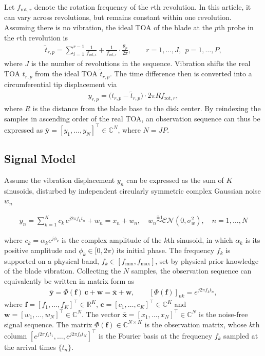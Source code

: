 \documentclass[journal,onecolumn]{IEEEtran}
\begin{document}
Let $f_{\mathrm{rot},r}$ denote the rotation frequency of the $r$th revolution. In this article, it can vary across revolutions, but remains constant within one revolution. Assuming there is no vibration, the ideal TOA of the blade at the $p$th probe in the $r$th revolution is 
\begin{eqnarray}
\label{eq:toa}
\tilde{t}_{r,p}=\sum_{i=1}^{r-1}\frac{1}{f_{\mathrm{rot},i}}+\frac{1}{f_{\mathrm{rot},r}}\cdot\frac{\theta_p}{2\pi},
\qquad r=1,\dots,J,\ \ p=1,\dots,P,
\end{eqnarray}
where $J$ is the number of revolutions in the sequence. Vibration shifts the real TOA $t_{r,p}$ from the ideal TOA $\tilde{t}_{r,p}$.  The time difference then is converted into a circumferential tip displacement via
\begin{eqnarray}
\label{eq:disp}
y_{r,p}=\big(t_{r,p}-\tilde{t}_{r,p}\big)\cdot 2\pi Rf_{\mathrm{rot},r},
\end{eqnarray}
where $R$ is the distance from the blade base to the disk center. By reindexing the samples in ascending order of the real TOA, an observation sequence can thus be expressed as $\bar{\mathbf{y}}=[y_1,\dots,y_N]^{\top}\in\mathbb{C}^{N}$, where $N=JP$.

\subsection{Signal Model}
Assume the vibration displacement $y_{n}$ can be expressed as the sum of $K$ sinusoids, disturbed by independent circularly symmetric complex Gaussian noise $w_n$

\begin{eqnarray}
\label{eq:signal}
    y_n = \sum_{k=1}^K c_k \, e^{j 2\pi f_k t_{n}} + w_{n} = x_{n} + w_{n}, \quad w_n \overset{\mathrm{iid}}{\sim} \mathcal{CN}(0,\sigma_w^2), \quad n = 1,\dots,N
\end{eqnarray}

where $c_k = \alpha_k e^{j \phi_k}$ is the complex amplitude of the $k$th sinusoid, in which $\alpha_k$ is its positive amplitude and $\phi_k\in[0,2\pi)$ its initial phase. The frequency $f_k$ is supported on a physical band, $f_k\in[f_{\min},f_{\max}]$, set by physical prior knowledge of the blade vibration.
Collecting the $N$ samples, the observation sequence can equivalently be written in matrix form as
\begin{eqnarray}
\label{eq:matrixform}
\bar{\mathbf{y}} = \Phi(\mathbf{f})\,\mathbf{c} + \mathbf{w} = \bar{\mathbf{x}} + \mathbf{w},
\qquad [\Phi(\mathbf{f})]_{nk} = e^{j 2\pi f_k t_{n}},
\end{eqnarray}
where $\mathbf{f}=[f_1,\dots,f_K]^{\top}\in\mathbb{R}^{K}$, $\mathbf{c}=[c_1,\dots,c_K]^{\top}\in\mathbb{C}^{K}$ and $\mathbf{w}=[w_1,\dots,w_N]^{\top}\in\mathbb{C}^{N}$. The vector $\bar{\mathbf{x}}=[x_1,\dots,x_N]^{\top}\in\mathbb{C}^{N}$ is the noise-free signal sequence. The matrix $\Phi(\mathbf{f})\in\mathbb{C}^{N\times K}$ is the observation matrix, whose $k$th column $[e^{j2\pi f_k t_1},\dots,e^{j2\pi f_k t_N}]^{\top}$ is the Fourier basis at the frequency $f_k$ sampled at the arrival times $\{t_n\}$.
\end{document}

